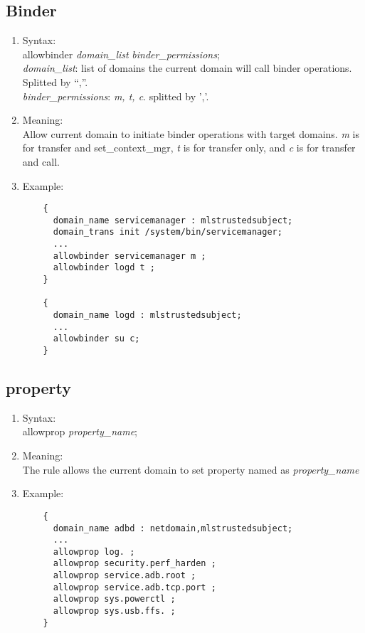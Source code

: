 \documentclass{article}
\begin{document}
\subsection{Binder}
\begin{enumerate}
	\item Syntax:\\
	allowbinder {\em domain\_list} {\em binder\_permissions};\\
	{\em domain\_list}: list of domains the current domain will call binder 
	operations. Splitted by ``,''.\\
	{\em binder\_permissions}: {\em m, t, c}. splitted by ','.
	\item Meaning:\\
	Allow current domain to initiate binder operations with target domains. 
	{\em m} is for transfer and set\_context\_mgr, {\em t} is for transfer 
	only, 
	and {\em c} is for transfer and call.
	\item Example:\\
	\begin{verbatim}
	{
	  domain_name servicemanager : mlstrustedsubject;
	  domain_trans init /system/bin/servicemanager;
	  ...
	  allowbinder servicemanager m ;
	  allowbinder logd t ;
	}
	
	{
	  domain_name logd : mlstrustedsubject;
	  ...
	  allowbinder su c;
	}
	\end{verbatim}
\end{enumerate}

\subsection{property}
\begin{enumerate}
	\item Syntax:\\
	allowprop {\em property\_name};
	\item Meaning:\\
	The rule allows the current domain to set property named as {\em 
		property\_name}
	\item Example:\\
	\begin{verbatim}
	{
	  domain_name adbd : netdomain,mlstrustedsubject;
	  ...
	  allowprop log. ;
	  allowprop security.perf_harden ;
	  allowprop service.adb.root ;
	  allowprop service.adb.tcp.port ;
	  allowprop sys.powerctl ;
	  allowprop sys.usb.ffs. ;
	}
	\end{verbatim}
\end{enumerate}
\end{document}
